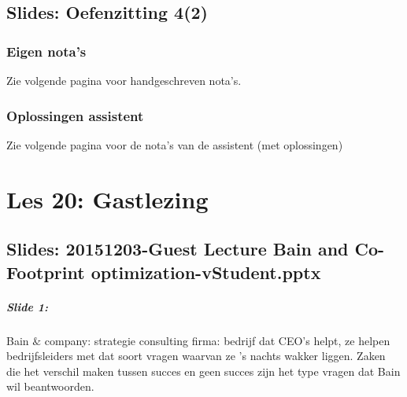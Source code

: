 \documentclass[10pt,a4paper]{report}
\begin{document}
\section{Slides: Oefenzitting 4(2)}
\subsection{Eigen nota's}
Zie volgende pagina voor handgeschreven nota's.



\subsection{Oplossingen assistent}
Zie volgende pagina voor de nota's van de assistent (met oplossingen)




\chapter{Les 20: Gastlezing}

\section{Slides: 20151203-Guest Lecture Bain and Co-Footprint optimization-vStudent.pptx}

\paragraph{Slide 1:} Bain $\&$ company: strategie consulting firma: bedrijf dat CEO's helpt, ze helpen bedrijfsleiders met dat soort vragen waarvan ze 's nachts wakker liggen. Zaken die het verschil maken tussen succes en geen succes zijn het type vragen dat Bain wil beantwoorden. 
\end{document}
